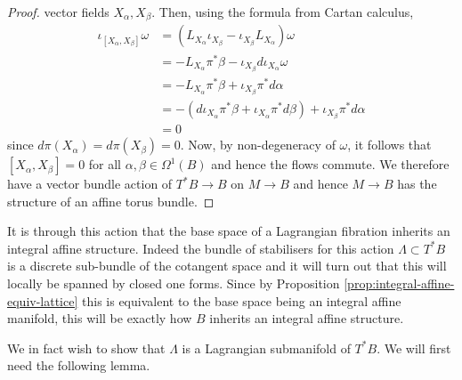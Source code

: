 \begin{proof}
    vector fields $X_{\alpha}, X_{\beta}$.  Then, using the formula from Cartan calculus,
    \begin{align*}
        \iota_{[X_{\alpha}, X_{\beta}]}\omega & = (L_{X_{\alpha}}\iota_{X_{\beta}} - \iota_{X_{\beta}}L_{X_{\alpha}})\omega                             \\
                                              & = -L_{X_{\alpha}}\pi^*\beta - \iota_{X_{\beta}}d\iota_{X_{\alpha}}\omega                                \\
                                              & = -L_{X_{\alpha}}\pi^* {\beta} + \iota_{X_{\beta}}\pi^*d\alpha                                          \\
                                              & = -(d\iota_{X_{\alpha}}\pi^* {\beta} + \iota_{X_{\alpha}}\pi^*d{\beta}) + \iota_{X_{\beta}}\pi^*d\alpha \\
                                              & = 0
    \end{align*}
    since $d\pi (X_{\alpha}) = d\pi(X_{\beta}) = 0$. Now, by non-degeneracy of $\omega$, it follows that $[X_{\alpha}, X_{\beta}] = 0$ for all $\alpha, \beta \in \Omega^1(B)$ and hence the flows commute. We therefore have a vector bundle action of $T^*B \to B$ on $M \to B$ and hence $M \to B$ has the structure of an affine torus bundle.
\end{proof}

It is through this action that the base space of a Lagrangian fibration
inherits an integral affine structure. Indeed the bundle of stabilisers for
this action $\Lambda \subset T^*B$ is a discrete sub-bundle of the cotangent
space and it will turn out that this will locally be spanned by closed one
forms. Since by Proposition \ref{prop:integral-affine-equiv-lattice} this is
equivalent to the base space being an integral affine manifold, this will be
exactly how $B$ inherits an integral affine structure.

We in fact wish to show that $\Lambda$ is a Lagrangian submanifold of $T^*B$.
We will first need the following lemma.

